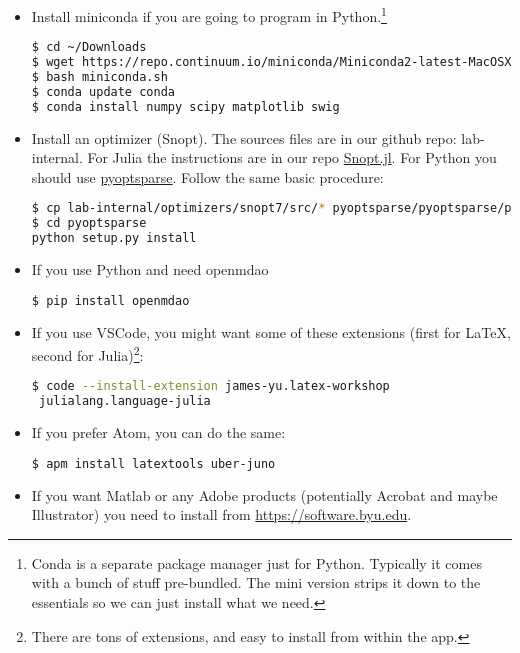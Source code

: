 \begin{itemize}
\item Install miniconda if you are going to program in  Python.\footnote{Conda is a separate package manager just for Python.  Typically it comes with a bunch of stuff pre-bundled.  The mini version strips it down to the essentials so we can just install what we need.}
\begin{lstlisting}[language=bash]
$ cd ~/Downloads
$ wget https://repo.continuum.io/miniconda/Miniconda2-latest-MacOSX-x86_64.sh -O miniconda.sh
$ bash miniconda.sh 
$ conda update conda
$ conda install numpy scipy matplotlib swig
\end{lstlisting}

\item Install an optimizer (Snopt).  The sources files are in our github repo: lab-internal.  For Julia the instructions are in our repo \href{https://github.com/byuflowlab/Snopt.jl}{Snopt.jl}.  For Python you should use \href{https://github.com/mdolab/pyoptsparse}{pyoptsparse}. Follow the same basic procedure:
\begin{lstlisting}[language=bash]
$ cp lab-internal/optimizers/snopt7/src/* pyoptsparse/pyoptsparse/pySNOPT/source/
$ cd pyoptsparse
python setup.py install
\end{lstlisting}

\item If you use Python and need openmdao
\begin{lstlisting}[language=bash]
$ pip install openmdao
\end{lstlisting}

\item If you use VSCode, you might want some of these extensions (first for LaTeX, second for Julia)\footnote{There are tons of extensions, and easy to install from within the app.}:
\begin{lstlisting}[language=bash]
$ code --install-extension james-yu.latex-workshop
 julialang.language-julia
\end{lstlisting}

\item If you prefer Atom, you can do the same:
\begin{lstlisting}[language=bash]
$ apm install latextools uber-juno
\end{lstlisting}

\item If you want Matlab or any Adobe products  (potentially Acrobat and maybe Illustrator) you need to install from \url{https://software.byu.edu}.


\end{itemize}
